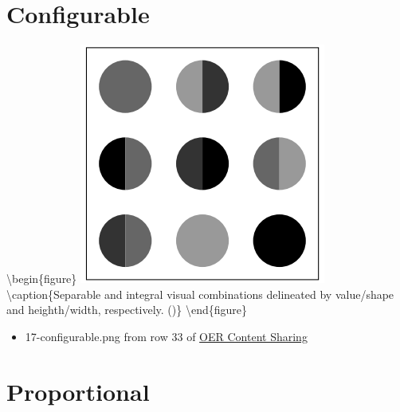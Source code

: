 \documentclass[
]{book}
\providecommand{\tightlist}{%
  \setlength{\itemsep}{0pt}\setlength{\parskip}{0pt}}
\begin{document}
\hypertarget{configurable}{%
\section{Configurable}\label{configurable}}

\textbackslash begin\{figure\}
\includegraphics[width=0.8\linewidth]{images/17-configurable} \textbackslash caption\{Separable and integral visual combinations delineated by value/shape and heighth/width, respectively. (\citet{elmer_symbol_2012})\}\label{fig:17-configurable}
\textbackslash end\{figure\}

\begin{itemize}
\tightlist
\item
  17-configurable.png from row 33 of \href{https://docs.google.com/spreadsheets/d/1LqzXn00wMeIjHWstNT3tMImNDZirLGc3g72jFOQc_8I/edit\#gid=817407192}{OER Content Sharing}
\end{itemize}

\hypertarget{proportional}{%
\section{Proportional}\label{proportional}}
\end{document}
